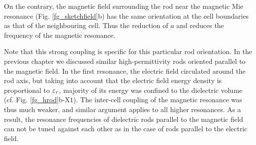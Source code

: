 On the contrary, the magnetic field surrounding the rod near the magnetic Mie resonance (Fig. \ref{fg_sketchfield}b) has the same orientation at the cell boundaries as that of the neighbouring cell. Thus the reduction of $a$ and reduces the frequency of the magnetic resonance.

Note that this strong coupling is specific for this particular rod orientation. In the previous chapter we discussed similar high-permittivity rods oriented parallel to the magnetic field. In the first resonance, the electric field circulated around the rod axis, but taking into account that the electric field energy density is proportional to $\varepsilon_r$, majority of its energy was confined to the dielectric volume (cf. Fig.  \ref{fg_hrod}b-$\text{X}1$).  The inter-cell coupling of the magnetic resonance was thus much weaker, and similar argument applies to all higher resonances. As a result, the resonance frequencies of dielectric rods parallel to the magnetic field can not be tuned against each other as in the case of rods parallel to the electric field.

